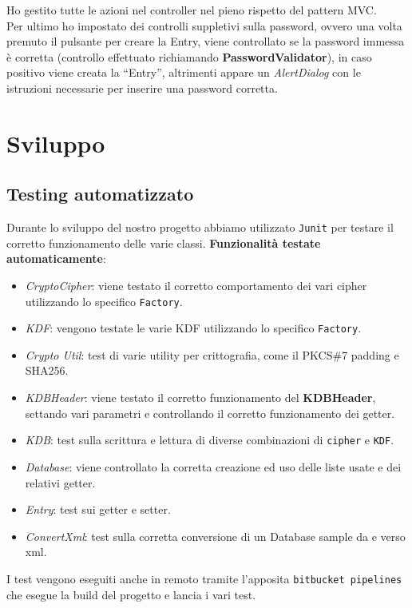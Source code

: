 \documentclass[a4paper,12pt]{report}
\begin{document}
Ho gestito tutte le azioni nel controller nel pieno rispetto del pattern MVC.\\

Per ultimo ho impostato dei controlli suppletivi sulla password, ovvero una volta premuto il pulsante per creare la Entry, viene controllato se la password immessa è corretta (controllo effettuato richiamando \textbf{PasswordValidator}), in caso positivo viene creata la “Entry”, altrimenti appare un \textit{AlertDialog} con le istruzioni necessarie per inserire una password corretta.


\chapter{Sviluppo}
\section{Testing automatizzato}

Durante lo sviluppo del nostro progetto abbiamo utilizzato \texttt{Junit} per
testare il corretto funzionamento delle varie classi.
\textbf{Funzionalità testate automaticamente}:
\begin{itemize}
  \item \textit{CryptoCipher}: viene testato il corretto comportamento dei vari cipher utilizzando lo specifico \texttt{Factory}.
  \item \textit{KDF}: vengono testate le varie KDF utilizzando lo specifico \texttt{Factory}.
  \item \textit{Crypto Util}: test di varie utility per crittografia, come il PKCS\#7 padding e SHA256.
  \item \textit{KDBHeader}: viene testato il corretto funzionamento del \textbf{KDBHeader}, settando vari parametri e controllando il corretto funzionamento dei getter.
  \item \textit{KDB}: test sulla scrittura e lettura di diverse combinazioni di \texttt{cipher} e \texttt{KDF}.
  \item \textit{Database}: viene controllato la corretta creazione ed uso delle liste usate e dei relativi getter.
  \item \textit{Entry}: test sui getter e setter.
  \item \textit{ConvertXml}: test sulla corretta conversione di un Database sample da e verso xml.
\end{itemize}

I test vengono eseguiti anche in remoto tramite l'apposita \texttt{bitbucket pipelines} che
esegue la build del progetto e lancia i vari test.
\end{document}
